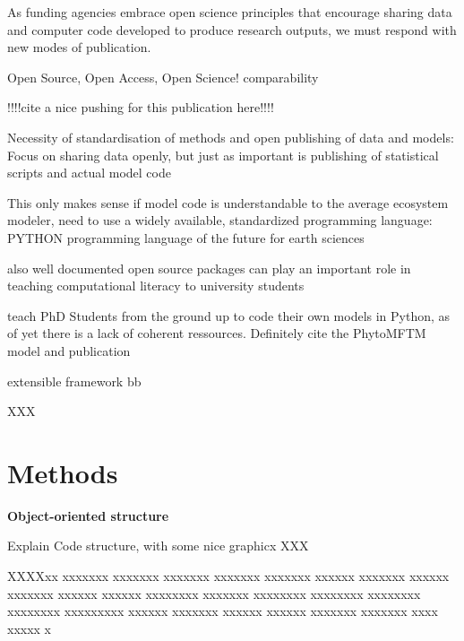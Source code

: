 As funding agencies embrace open science principles that encourage sharing data and computer code developed to produce research outputs, we must respond with new modes of publication.

Open Source, Open Access, Open Science!
comparability

!!!!cite a nice pushing for this publication here!!!!

Necessity of standardisation of methods and open publishing of data and models: \citep{Reichman2011}
Focus on sharing data openly, but just as important is publishing of statistical scripts and actual model code

This only makes sense if model code is understandable to the average ecosystem modeler, need to use a widely available, standardized programming language:
PYTHON
programming language of the future for earth sciences \citep{Lin2012}

also well documented open source packages can play an important role in teaching computational literacy to university students \citep{Farrell2018}



teach PhD Students from the ground up to code their own models in Python, as of yet there is a lack of coherent ressources. Definitely cite the PhytoMFTM model and publication \citep{AcevedoTrejos2016}

extensible framework
bb



XXX

\section{Methods}



\small {\textbf{Object-oriented structure}}

Explain Code structure, with some nice graphicx
XXX

XXXXxx xxxxxxx xxxxxxx xxxxxxx xxxxxxx xxxxxxx xxxxxx xxxxxxx xxxxxx xxxxxxx xxxxxx xxxxxx xxxxxxxx xxxxxxx xxxxxxxx xxxxxxxx xxxxxxxx xxxxxxxx xxxxxxxxx xxxxxx xxxxxxx xxxxxx xxxxxx xxxxxxx xxxxxxx xxxx xxxxx x


